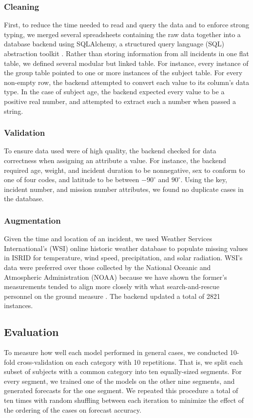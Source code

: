 \documentclass[12pt,titlepage]{article}
\begin{document}
      \subsubsection{Cleaning}
        First, to reduce the time needed to read and query the data and to
        enforce strong typing, we merged several spreadsheets containing the
        raw data together into a database backend using SQLAlchemy, a
        structured query language (SQL) abstraction toolkit \cite{sqlalchemy}.
        Rather than storing information from all incidents in one flat table,
        we defined several modular but linked table. For instance, every
        instance of the group table pointed to one or more instances of the
        subject table. For every non-empty row, the backend attempted to
        convert each value to its column's data type. In the case of subject
        age, the backend expected every value to be a positive real number, and
        attempted to extract such a number when passed a string.

      \subsubsection{Validation}
        To ensure data used were of high quality, the backend checked for
        data correctness when assigning an attribute a value. For instance,
        the backend required age, weight, and incident duration to be
        nonnegative, sex to conform to one of four codes, and latitude to be
        between $-90^\circ$ and $90^\circ$. Using the key, incident number, and
        mission number attributes, we found no duplicate cases in the database.

      \subsubsection{Augmentation}
        Given the time and location of an incident, we used Weather Services
        International's (WSI) online historic weather database \cite{wsi} to
        populate missing values in ISRID for temperature, wind speed,
        precipitation, and solar radiation. WSI's data were preferred over
        those collected by the National Oceanic and Atmospheric Administration
        (NOAA) because we have shown the former's measurements tended to align
        more closely with what search-and-rescue personnel on the ground
        measure \cite{lee}. The backend updated a total of 2821 instances.

    \subsection{Evaluation}
      To measure how well each model performed in general cases, we conducted
      10-fold cross-validation on each category with 10 repetitions. That is,
      we split each subset of subjects with a common category into ten
      equally-sized segments. For every segment, we trained one of the models
      on the other nine segments, and generated forecasts for the one segment.
      We repeated this procedure a total of ten times with random shuffling
      between each iteration to minimize the effect of the ordering of the
      cases on forecast accuracy.
\end{document}
